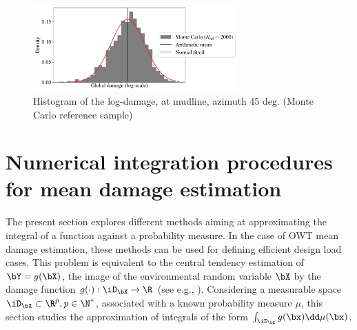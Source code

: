 \begin{figure}[!h]
\begin{center}
    \includegraphics[width=0.7\textwidth]{part2/figures/DCE/teesside/reference_log_histogramNode1_45.pdf}
\end{center}
\caption{Histogram of the log-damage, at mudline, azimuth 45 deg. (Monte Carlo reference sample)}
\label{fig:histo_mc}
\end{figure}

\section{Numerical integration procedures for mean damage estimation}\label{sec:sec43}
The present section explores different methods aiming at approximating the integral of a function against a probability measure. 
In the case of OWT mean damage estimation, these methods can be used for defining efficient design load cases. 
This problem is equivalent to the central tendency estimation of $\bY = g(\bX)$, the image of the environmental random variable $\bX$ by the damage function $g(\cdot): \iD_\bX \to \R$ (see e.g., ). 
Considering a measurable space $\iD_\bX \subset \R^p, p \in \N^*$, associated with a known probability measure $\mu$, this section studies the approximation of integrals of the form $\int_{\iD_\bX} g(\bx) \dd\mu(\bx)$. 
